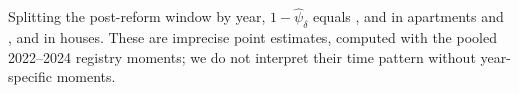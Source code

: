 Splitting the post-reform window by year, $1-\hat\psi_\delta$ equals \attOneMinusPsiYoneApt, \attOneMinusPsiYtwoApt{} and \attOneMinusPsiYthreeApt{} in apartments and \attOneMinusPsiYoneHouse, \attOneMinusPsiYtwoHouse{} and \attOneMinusPsiYthreeHouse{} in houses. These are imprecise point estimates, computed with the pooled 2022--2024 registry moments; we do not interpret their time pattern without year-specific moments. %
